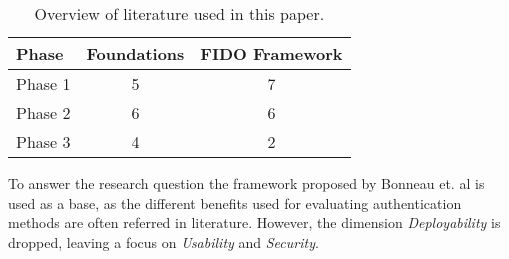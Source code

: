 \begin{table}[ht]
    \centering
    \caption{Overview of literature used in this paper.}
    \label{tab:literature_review}
    \begin{tabular}{ l | c | c }
        \textbf{Phase} & \textbf{Foundations} & \textbf{FIDO Framework}\\
        \hline
        Phase 1 & 5 & 7\\
        Phase 2 & 6 & 6\\
        Phase 3 & 4 & 2\\
    \end{tabular}
\end{table}

To answer the research question the framework proposed by Bonneau et. al \citep{bonneau2012} is used as a base, as the different benefits used for evaluating authentication methods are often referred in literature. However, the dimension \emph{Deployability} is dropped, leaving a focus on \emph{Usability} and \emph{Security}.